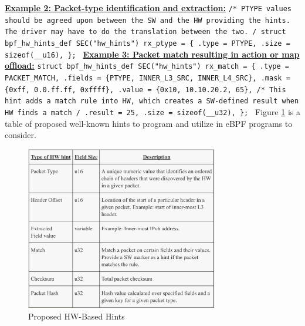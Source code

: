 \documentclass[letterpaper]{article}
\begin{document}
\newline
\newline
\textbf{\underline{Example 2: Packet-type identification and extraction:}}
\newline
\newline
{\scriptsize \texttt{/* PTYPE values should be agreed upon between the
\newline
\space \space * SW and the HW providing the hints. The driver
\newline
\space \space * may have to do the translation between the two.
\newline
\space \space */
\newline
struct bpf\_hw\_hints\_def SEC("hw\_hints") rx\_ptype = \{
\newline
\indent .type = PTYPE,
\newline
\indent .size = sizeof(\_\_u16),
\newline
\};
}}
\newline
\newline
\textbf{\underline{Example 3: Packet match resulting in action or map offload:}}
\newline
\newline
{\scriptsize \texttt{struct bpf\_hw\_hints\_def SEC("hw\_hints") rx\_match = \{
\newline
\indent .type = PACKET\_MATCH,
\newline
\indent .fields = \{PTYPE, INNER\_L3\_SRC, INNER\_L4\_SRC\},
\newline
\indent .mask = \{0xff, 0.0.ff.ff, 0xffff\},
\newline
\indent .value = \{0x10, 10.10.20.2, 65\},
\newline
\indent /* This hint adds a match rule into HW, which creates a
\newline
\indent \space * SW-defined result when HW finds a match
\newline
\indent \space */
\newline
\indent .result = 25,
\newline
\indent .size = sizeof(\_\_u32),
\newline
\};
}}
\newline
\newline
\indent Figure \ref{xdp-hint-types} is a table of proposed well-known hints to program and utilize in eBPF programs to consider.

\begin{figure}[h]
\includegraphics[width=3.31in]{xdp-hint-types.png}
\caption{Proposed HW-Based Hints}
\label{xdp-hint-types}
\end{figure}
\end{document}
